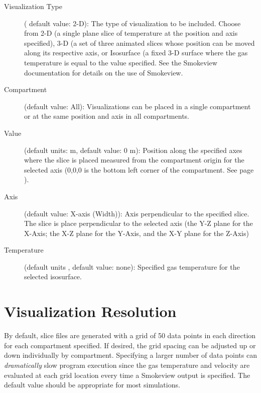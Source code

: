 \begin{description}
\item[Visualization Type] ( default value: 2-D): The type of visualization to be included. Choose from 2-D (a single plane slice of temperature at the position and axis specified), 3-D (a set of three animated slices whose position can be moved along its respective axis, or Isosurface (a fixed 3-D surface where the gas temperature is equal to the value specified. See the Smokeview documentation \cite{Smokeview_Users_Guide_6} for details on the use of Smokeview.

\item[Compartment] (default value: All): Visualizations can be placed in a single compartment or at the same position and axis in all compartments.

\item[Value] (default units: m, default value: 0 m): Position along the specified axes where the slice is placed measured from the compartment origin for the selected axis (0,0,0 is the bottom left corner of the compartment. See page \pageref{Compartment_Geometry}).

\item[Axis] (default value: X-axis (Width)): Axis perpendicular to the specified slice.  The slice is place perpendicular to the selected axis (the Y-Z plane for the X-Axis; the X-Z plane for the Y-Axis, and the X-Y plane for the Z-Axis)

\item[Temperature] (default units \degc, default value: none): Specified gas temperature for the selected isosurface.
\end{description}


\section{Visualization Resolution}
\label{info:SLCF2}

By default, slice files are generated with a grid of 50 data points in each direction for each compartment specified. If desired, the grid spacing can be adjusted up or down individually by compartment. Specifying a larger number of data points can \textit{dramatically} slow program execution since the gas temperature and velocity are evaluated at each grid location every time a Smokeview output is specified.  The default value should be appropriate for most simulations.

